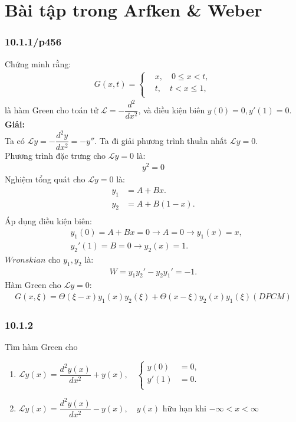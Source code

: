 \documentclass{report}
\begin{document}
\section{Bài tập trong Arfken \& Weber}


\subsubsection{10.1.1/p456}
Chứng minh rằng:
\begin{align*}
	G(x,t) =
	\begin{cases}
		 & x , \quad 0 \leq x < t, \\
		 & t , \quad t < x\leq 1 , \\
	\end{cases}
\end{align*}
là hàm Green cho toán tử $\mathcal{L} = -\dfrac{d^2}{dx^2}$, và điều kiện biên $y(0) = 0, y'(1) = 0$.\\

\textbf{Giải:}\\
Ta có $\mathcal{L} y = -\dfrac{d^2 y}{dx^2}  = -y''$. Ta đi giải phương trình thuần nhất $\mathcal{L} y = 0$.\\
Phương trình đặc trưng cho $\mathcal{L} y = 0$ là:
\begin{align*}
	y^2 = 0
\end{align*}
Nghiệm tổng quát cho $\mathcal{L} y = 0$ là:
\begin{align*}
	y_1 & = A + Bx.     \\
	y_2 & = A + B(1-x). \\
\end{align*}
Áp dụng điều kiện biên:
\begin{align*}
	 & y_1(0) = A + Bx = 0 \rightarrow A = 0 \rightarrow y_1(x) = x, \\
	 & y_{2}{'}(1) = B = 0 \rightarrow y_2(x) = 1.
\end{align*}
$Wronskian$ cho $y_1,y_2$ là:
\begin{align*}
	W = y_{1} y_{2}' - y_{2} y_{1}' = -1.
\end{align*}
Hàm Green cho $\mathcal{L} y = 0$:
\begin{align*}
	G(x,\xi)  = \Theta(\xi - x) y_1(x)y_2(\xi) + \Theta(x - \xi) y_2(x)y_1(\xi) (DPCM)
\end{align*}
\subsubsection{10.1.2}
Tìm hàm Green cho
\begin{enumerate}[label=(\alph*)]
	\item $\mathcal{L} y(x) = \dfrac{d^2 y(x)}{dx^2} + y(x) ,\quad
		      \begin{cases}
			      y(0)  & = 0, \\
			      y'(1) & = 0. \\
		      \end{cases}$
	\item  $\mathcal{L} y(x) = \dfrac{d^2 y(x)}{dx^2} - y(x) , \quad y(x)$ hữu hạn khi $-\infty < x < \infty$\\
\end{enumerate}
\end{document}
